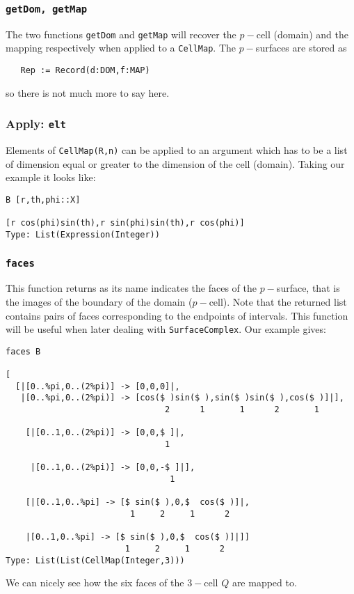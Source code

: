 \documentclass[12pt,a4paper]{article}
\begin{document}
\subsubsection{{\tt getDom, getMap}}
The two functions {\tt getDom} and {\tt getMap} will recover the 
$p-$cell (domain) and the mapping respectively when applied to
a {\tt CellMap}. The $p-$surfaces are stored as
\begin{verbatim}
   Rep := Record(d:DOM,f:MAP)
\end{verbatim}
so there is not much more to say here.
%
\subsubsection{{Apply: \tt elt}}
Elements of {\tt CellMap(R,n)} can be applied to an argument which has
to be a list of dimension equal or greater to the dimension of the 
cell (domain). Taking our example it looks like:
\begin{lstlisting}
B [r,th,phi::X]

[r cos(phi)sin(th),r sin(phi)sin(th),r cos(phi)]
Type: List(Expression(Integer))
\end{lstlisting}
%
\subsubsection{{\tt faces}}
This function returns as its name indicates the faces of the $p-$surface, 
that is the images of the boundary of the domain ($p-$cell). Note that 
the returned list contains pairs of faces corresponding to the endpoints 
of intervals. This function will be useful when later dealing with
{\tt SurfaceComplex}. Our example gives:
\scriptsize
\begin{verbatim}
faces B

[
  [|[0..%pi,0..(2%pi)] -> [0,0,0]|,
   |[0..%pi,0..(2%pi)] -> [cos($ )sin($ ),sin($ )sin($ ),cos($ )]|],
                                2      1       1      2       1

    [|[0..1,0..(2%pi)] -> [0,0,$ ]|,
                                1
                              
     |[0..1,0..(2%pi)] -> [0,0,-$ ]|],
                                 1   
                                
    [|[0..1,0..%pi] -> [$ sin($ ),0,$  cos($ )]|,
                         1     2     1      2                   
    
    |[0..1,0..%pi] -> [$ sin($ ),0,$  cos($ )]|]]           
                        1     2     1      2                
Type: List(List(CellMap(Integer,3)))
\end{verbatim}
\normalsize 
We can nicely see how the six faces of the $3-$cell $Q$ are mapped to.
\end{document}
